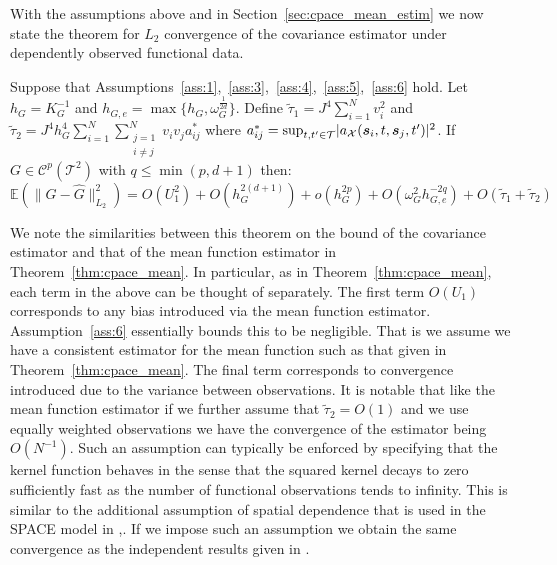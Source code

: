 With the assumptions above and in Section~\ref{sec:cpace_mean_estim} we now state the theorem for $L_2$ convergence of the covariance estimator under dependently observed functional data.

\begin{theorem}
	Suppose that Assumptions~\ref{ass:1},~\ref{ass:3},~\ref{ass:4},~\ref{ass:5},~\ref{ass:6} hold. 
	Let $h_G = K_G^{-1}$ and $h_{G,e} = \max\{h_{G}, \omega_G^{\frac{1}{2d}}\}$.
	Define $\tilde{\tau}_1 = J^4 \sum_{i=1}^N v_i^2$ and $\tilde{\tau}_2 =J^4 h_G^4 \sum_{i=1}^N \sum_{\substack{j=1 \\ i \ne j}}^N v_i v_j a_{ij}^* $ where $a_{ij}^* = \sup_{t, t^\prime \in \mathcal{T}} \lvert a_\mathcal{X}(\bm{{s}}_{i}, t, \bm{{s}}_{j}, t^\prime) \rvert^2$. 
	If $G \in \mathcal{C}^p\left(\mathcal{T}^2\right)$ with $q \le \min(p, d+1)$ then:
	\begin{equation}
		\mathbb{E}\left(\lVert G - \hat{G} \rVert_{L_2}^2\right) = O(U_1^2) + O(h_G^{2(d+1)}) + o(h_G^{2p}) + O(\omega_G^2 h_{G,e}^{-2q}) + O(\tilde{\tau}_1 + \tilde{\tau}_2)
	\end{equation}
\label{thm:cpace_cov}
\end{theorem}

We note the similarities between this theorem on the bound of the covariance estimator and that of the mean function estimator in Theorem~\ref{thm:cpace_mean}.
In particular, as in Theorem~\ref{thm:cpace_mean}, each term in the above can be thought of separately. 
The first term $O(U_1)$ corresponds to any bias introduced via the mean function estimator.
Assumption~\ref{ass:6} essentially bounds this to be negligible.
That is we assume we have a consistent estimator for the mean function such as that given in Theorem~\ref{thm:cpace_mean}.
The final term corresponds to convergence introduced due to the variance between observations. 
It is notable that like the mean function estimator if we further assume that $\tilde{\tau}_2 = O(1)$ and we use equally weighted observations we have the convergence of the estimator being $O(N^{-1})$.
Such an assumption can typically be enforced by specifying that the kernel function behaves in the sense that the squared kernel decays to zero sufficiently fast as the number of functional observations tends to infinity.
This is similar to the additional assumption of spatial dependence that is used in the SPACE model in ,\citep{liu_functional_2017}.
If we impose such an assumption we obtain the same convergence as the independent results given in \citep{xiao_asymptotic_2020}.


